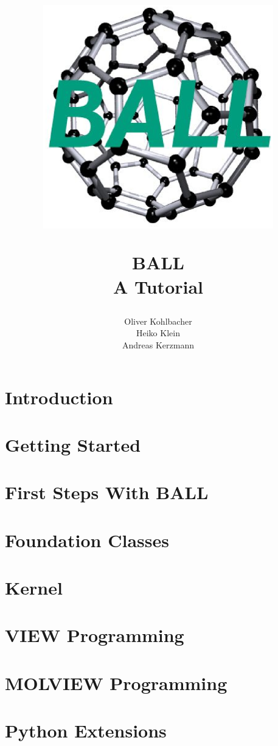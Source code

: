 \documentclass[12pt,twoside]{report}
\author{Oliver Kohlbacher\\ Heiko Klein\\ Andreas Kerzmann}
\title{
	\begin{center}
		\includegraphics[width=10cm]{logo.eps}
	\end{center}
	\Huge BALL\\ 
	\Large A Tutorial
}
\begin{document}
\maketitle

\setcounter{page}{1}
\tableofcontents
{}
\setcounter{page}{1}


\chapter{Introduction}
\label{chapter:introduction}



\chapter{Getting Started}
\label{chapter:getting-started}




\chapter{First Steps With BALL}
\label{chapter:first-steps}




\chapter{Foundation Classes}
\label{chapter:foundation-classes}




\chapter{Kernel}
\label{chapter:kernel}


\chapter{VIEW Programming}
\label{chapter:view-programming}


\chapter{MOLVIEW Programming}
\label{chapter:molview-programming}


\chapter{Python Extensions}
\label{chapter:python}

\end{document}
